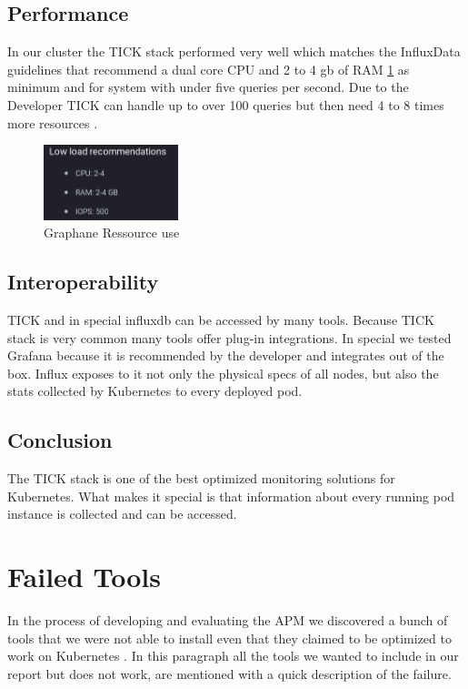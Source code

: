 \subsection{Performance}
In our cluster the TICK stack performed very well which matches the InfluxData guidelines that recommend a dual core CPU and 2 to 4 gb of RAM \cref{fig:TICK_recommendet} as minimum and for system with under five queries per second. Due to the Developer TICK can handle up to over 100 queries but then need 4 to 8 times more resources \cite{influx_require}.
\begin{figure}
\centering
\includegraphics[width=0.35\textwidth]{Bilder/Performance/TICK_recommendet}
\caption{Graphane Ressource use}
\label{fig:TICK_recommendet}
\end{figure}

\subsection{Interoperability}
TICK and in special influxdb can be accessed by many tools. Because TICK stack is very common many tools offer plug-in integrations. In special we tested Grafana because it is recommended by the developer and integrates out of the box. Influx exposes to it not only the physical specs of all nodes, but also the stats collected by Kubernetes to every deployed pod. 
\subsection{Conclusion}
The TICK stack is one of the best optimized monitoring solutions for Kubernetes. What makes it special is that information about every running pod instance is collected and can be accessed.



\section{Failed Tools}%
In the process of developing and evaluating the APM we discovered a bunch of tools that we were not able to install even that they claimed to be optimized to work on Kubernetes .
In this paragraph all the tools we wanted to include in our report but does not work, are mentioned with a quick description of the failure.
